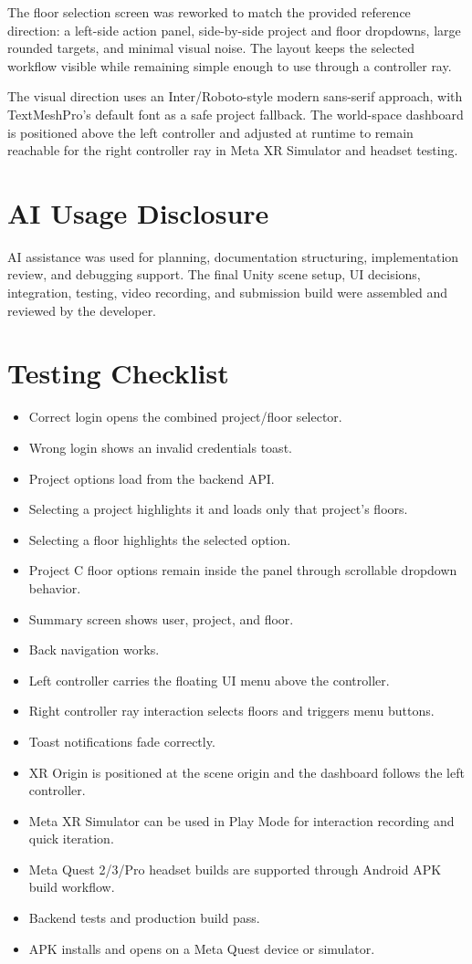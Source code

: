 \documentclass[11pt,a4paper]{article}
\begin{document}
The floor selection screen was reworked to match the provided reference direction: a left-side action panel, side-by-side project and floor dropdowns, large rounded targets, and minimal visual noise. The layout keeps the selected workflow visible while remaining simple enough to use through a controller ray.

The visual direction uses an Inter/Roboto-style modern sans-serif approach, with TextMeshPro's default font as a safe project fallback. The world-space dashboard is positioned above the left controller and adjusted at runtime to remain reachable for the right controller ray in Meta XR Simulator and headset testing.

\section{AI Usage Disclosure}
AI assistance was used for planning, documentation structuring, implementation review, and debugging support. The final Unity scene setup, UI decisions, integration, testing, video recording, and submission build were assembled and reviewed by the developer.

\section{Testing Checklist}
\begin{itemize}
    \item Correct login opens the combined project/floor selector.
    \item Wrong login shows an invalid credentials toast.
    \item Project options load from the backend API.
    \item Selecting a project highlights it and loads only that project's floors.
    \item Selecting a floor highlights the selected option.
    \item Project C floor options remain inside the panel through scrollable dropdown behavior.
    \item Summary screen shows user, project, and floor.
    \item Back navigation works.
    \item Left controller carries the floating UI menu above the controller.
    \item Right controller ray interaction selects floors and triggers menu buttons.
    \item Toast notifications fade correctly.
    \item XR Origin is positioned at the scene origin and the dashboard follows the left controller.
    \item Meta XR Simulator can be used in Play Mode for interaction recording and quick iteration.
    \item Meta Quest 2/3/Pro headset builds are supported through Android APK build workflow.
    \item Backend tests and production build pass.
    \item APK installs and opens on a Meta Quest device or simulator.
\end{itemize}
\end{document}
